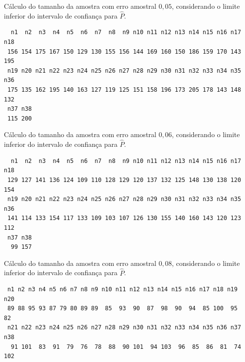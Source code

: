\documentclass[12pt]{article}\usepackage[]{graphicx}\usepackage[]{color}
\makeatletter
\newenvironment{kframe}{%
 \def\at@end@of@kframe{}%
 \ifinner\ifhmode%
  \def\at@end@of@kframe{\end{minipage}}%
  \begin{minipage}{\columnwidth}%
 \fi\fi%
 \def\FrameCommand##1{\hskip\@totalleftmargin \hskip-\fboxsep
 \colorbox{shadecolor}{##1}\hskip-\fboxsep
     \hskip-\linewidth \hskip-\@totalleftmargin \hskip\columnwidth}%
 \MakeFramed {\advance\hsize-\width
   \@totalleftmargin\z@ \linewidth\hsize
   \@setminipage}}%
 {\par\unskip\endMakeFramed%
 \at@end@of@kframe}
\newenvironment{knitrout}{}{} %
\makeatother
\begin{document}
Cálculo do tamanho da amostra com erro amostral $0,05$, considerando o limite
inferior do intervalo de confiança para $\hat{P}$.



\begin{knitrout}\footnotesize
{}\color{fgcolor}\begin{kframe}
\begin{verbatim}
  n1  n2  n3  n4  n5  n6  n7  n8  n9 n10 n11 n12 n13 n14 n15 n16 n17 n18
 156 154 175 167 150 129 130 155 156 144 169 160 150 186 159 170 143 195
 n19 n20 n21 n22 n23 n24 n25 n26 n27 n28 n29 n30 n31 n32 n33 n34 n35 n36
 175 135 162 195 140 163 127 119 125 151 158 196 173 205 178 143 148 132
 n37 n38
 115 200
\end{verbatim}
\end{kframe}
\end{knitrout}

Cálculo do tamanho da amostra com erro amostral $0,06$, considerando o limite
inferior do intervalo de confiança para $\hat{P}$.


\begin{knitrout}\footnotesize
{}\color{fgcolor}\begin{kframe}
\begin{verbatim}
  n1  n2  n3  n4  n5  n6  n7  n8  n9 n10 n11 n12 n13 n14 n15 n16 n17 n18
 129 127 141 136 124 109 110 128 129 120 137 132 125 148 130 138 120 154
 n19 n20 n21 n22 n23 n24 n25 n26 n27 n28 n29 n30 n31 n32 n33 n34 n35 n36
 141 114 133 154 117 133 109 103 107 126 130 155 140 160 143 120 123 112
 n37 n38
  99 157
\end{verbatim}
\end{kframe}
\end{knitrout}

Cálculo do tamanho da amostra com erro amostral $0,08$, considerando o limite
inferior do intervalo de confiança para $\hat{P}$.


\begin{knitrout}\footnotesize
{}\color{fgcolor}\begin{kframe}
\begin{verbatim}
 n1 n2 n3 n4 n5 n6 n7 n8 n9 n10 n11 n12 n13 n14 n15 n16 n17 n18 n19 n20
 89 88 95 93 87 79 80 89 89  85  93  90  87  98  90  94  85 100  95  82
 n21 n22 n23 n24 n25 n26 n27 n28 n29 n30 n31 n32 n33 n34 n35 n36 n37 n38
  91 101  83  91  79  76  78  88  90 101  94 103  96  85  86  81  74 102
\end{verbatim}
\end{kframe}
\end{knitrout}
\end{document}
